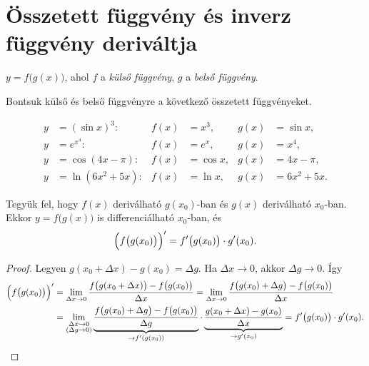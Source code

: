 \documentclass[11pt]{article}
\begin{document}
\section{Összetett függvény és inverz függvény deriváltja}

\begin{defbox}
\begin{definition}
$y=f\bigl(g(x)\bigr)$, ahol $f$ a \emph{külső függvény}, $g$ a \emph{belső függvény}.
\end{definition}
\end{defbox}

\begin{exbox}
\begin{example}
Bontsuk külső és belső függvényre a következő összetett függvényeket.
\end{example}
\end{exbox}
\begin{solution}
\begin{align*}
y&=(\sin x)^{3}: & f(x)&=x^{3}, & g(x)&=\sin x,\\
y&=e^{x^{4}}: & f(x)&=e^{x}, & g(x)&=x^{4},\\
y&=\cos(4x-\pi): & f(x)&=\cos x, & g(x)&=4x-\pi,\\
y&=\ln(6x^{2}+5x): & f(x)&=\ln x, & g(x)&=6x^{2}+5x .
\end{align*}
\end{solution}

\begin{thmbox}
\begin{theorem}
Tegyük fel, hogy $f(x)$ deriválható $g(x_{0})$-ban és $g(x)$ deriválható $x_{0}$-ban. Ekkor $y=f\bigl(g(x)\bigr)$ is differenciálható $x_{0}$-ban, és
\begin{equation}\label{eq:lanc}
\Bigl(f\bigl(g(x_{0})\bigr)\Bigr)'=f'\bigl(g(x_{0})\bigr)\cdot g'(x_{0}).
\end{equation}
\end{theorem}
\end{thmbox}
\begin{proof}
Legyen $g(x_{0}+\Delta x)-g(x_{0})=\Delta g$. Ha $\Delta x\to 0$, akkor $\Delta g\to 0$. Így
\begin{align*}
\Bigl(f\bigl(g(x_{0})\bigr)\Bigr)'&=\lim_{\Delta x\to 0}\frac{f\bigl(g(x_{0}+\Delta x)\bigr)-f\bigl(g(x_{0})\bigr)}{\Delta x}
=\lim_{\Delta x\to 0}\frac{f\bigl(g(x_{0})+\Delta g\bigr)-f\bigl(g(x_{0})\bigr)}{\Delta x}\\
&=\lim_{\substack{\Delta x\to 0\\ (\Delta g\to 0)}}
\underbrace{\frac{f\bigl(g(x_{0})+\Delta g\bigr)-f\bigl(g(x_{0})\bigr)}{\Delta g}}_{\to f'(g(x_{0}))}\cdot
\underbrace{\frac{g(x_{0}+\Delta x)-g(x_{0})}{\Delta x}}_{\to g'(x_{0})}
=f'\bigl(g(x_{0})\bigr)\cdot g'(x_{0}). \qedhere
\end{align*}
\end{proof}
\end{document}
